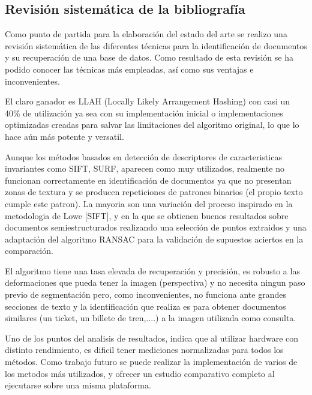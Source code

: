 \subsection{Revisión sistemática de la bibliografía}
Como punto de partida para la elaboración del estado del arte se realizo una revisión sistemática de las diferentes técnicas para la identificación de documentos y su recuperación de una base de datos. Como resultado de esta revisión se ha podido conocer las técnicas más empleadas, así como sus ventajas e inconvenientes. 

El claro ganador es LLAH (Locally Likely Arrangement Hashing) con casi un 40\% de utilización ya sea con su implementación inicial o implementaciones optimizadas creadas para salvar las limitaciones del algoritmo original, lo que lo hace aún más potente y versatil.

Aunque los métodos basados en detección de descriptores de caracteristicas invariantes como SIFT, SURF, aparecen como muy utilizados, realmente no funcionan correctamente en identificación de documentos ya que no presentan zonas de textura y se producen repeticiones de patrones binarios (el propio texto cumple este patron). La mayoria son una variación del proceso inspirado en la metodologia de Lowe [SIFT], y en la que se obtienen buenos resultados sobre documentos semiestructurados realizando una selección de puntos extraidos y una adaptación del algoritmo RANSAC para la validación de supuestos aciertos en la comparación. 

El algoritmo tiene una tasa elevada de recuperación y precisión, es robusto a las deformaciones que pueda tener la imagen (perspectiva) y no necesita ningun paso previo de segmentación pero, como inconvenientes, no funciona ante grandes secciones de texto y la identificación que realiza es para obtener documentos similares (un ticket, un billete de tren,....) a la imagen utilizada como consulta.

Uno de los puntos del analisis de resultados, indica que al utilizar hardware con distinto rendimiento, es dificil tener mediciones normalizadas para todos los métodos. Como trabajo futuro se puede realizar la implementación de varios de los metodos más utilizados, y ofrecer un estudio comparativo completo al ejecutarse sobre una misma plataforma.

